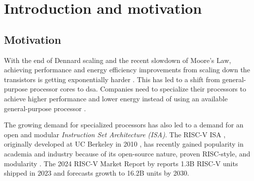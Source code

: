 
\chapter{Introduction and motivation}
\label{Introduction} 





\section{Motivation}


With the end of Dennard scaling and the recent slowdown of Moore's Law, achieving performance and energy efficiency improvements from scaling down the transistors is getting exponentially harder \cite{hennessyComputerArchitectureQuantitative2019}. This has led to a shift from general-purpose processor cores to \acrfull{dsa}. Companies need to specialize their processors to achieve higher performance and lower energy instead of using an available general-purpose processor \cite{mezgerSurveyRISCVArchitecture2022}. 


The growing demand for specialized processors has also led to a demand for an open and modular \textit{Instruction Set Architecture (ISA)}. The RISC-V ISA \cite{watermanRISCVInstructionSet2019,watermanRISCVInstructionSet2021}, originally developed at UC Berkeley in 2010 \cite{pattersonComputerOrganizationDesign2021}, has recently gained popularity in academia and industry because of its open-source nature, proven RISC-style, and modularity \cite{theshdgroupRISCVMarketReport2024, asanovicInstructionSetsShould2014}.
The 2024 RISC-V Market Report by \textcite{theshdgroupRISCVMarketReport2024} reports 1.3B RISC-V units shipped in 2023 and forecasts growth to 16.2B units by 2030.


